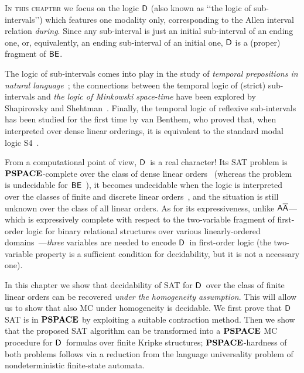 \lettrine[lines=3]{I}{n this chapter} we focus on the logic 
$\mathsf{D}$ (also known as \lq\lq the logic of sub-intervals\rq\rq) which features one modality only, corresponding to the Allen interval relation \emph{during}. Since any sub-interval is just an initial sub-interval of an ending one, or, equivalently, an ending sub-interval of an initial one, $\mathsf{D}$ is a (proper) fragment of $\mathsf{BE}$. 

The logic of sub-intervals comes into play in the study of \emph{temporal prepositions in natural language}~\cite{DBLP:journals/ai/Pratt-Hartmann05};
the connections between the temporal logic of (strict) sub-intervals and 
\emph{the logic of Minkowski space-time} have been explored by Shapirovsky and Shehtman~\cite{DBLP:journals/logcom/ShapirovskyS05}.
Finally, the temporal logic of reflexive sub-intervals has been studied for the
first time by van Benthem, who proved that, when interpreted over dense linear 
orderings, it is equivalent to the standard modal logic S4~\cite{DBLP:journals/jphil/Benthem91}.

From a computational point of view, $\mathsf{D}$\ is a real character! Its SAT problem is $\textbf{PSPACE}$-complete over the class of dense linear orders~\cite{DBLP:journals/logcom/BresolinGMS10,DBLP:conf/aiml/Shapirovsky04} (whereas the problem is undecidable for $\mathsf{BE}$~\cite{DBLP:conf/asian/Lodaya00}), it becomes undecidable when the logic is interpreted over the classes of finite and discrete linear orders~\cite{DBLP:journals/fuin/MarcinkowskiM14}, and the situation is still unknown over the class of all linear orders. As for its expressiveness, unlike $\mathsf{A\overline{A}}$---which is expressively complete with respect to the two-variable fragment of first-order logic for binary relational structures over various linearly-ordered domains~\cite{DBLP:journals/apal/BresolinGMS09,DBLP:journals/jsyml/Otto01}---\emph{three} variables are needed to encode $\mathsf{D}$\ in first-order logic (the two-variable property is a sufficient condition for decidability, but it is not a necessary one). 


In this chapter we show that decidability of SAT for $\mathsf{D}$\ over the class of finite linear orders can be recovered \emph{under the homogeneity assumption}. This will allow us to show that also MC under homogeneity is decidable. We first prove that $\mathsf{D}$ SAT is in $\textbf{PSPACE}$ by exploiting a suitable contraction method. Then we show that the proposed SAT algorithm can be transformed into a $\textbf{PSPACE}$ MC procedure for $\mathsf{D}$\ formulas over finite Kripke structures; $\textbf{PSPACE}$-hardness of both problems follows via a reduction from the language universality problem of nondeterministic finite-state automata. 

